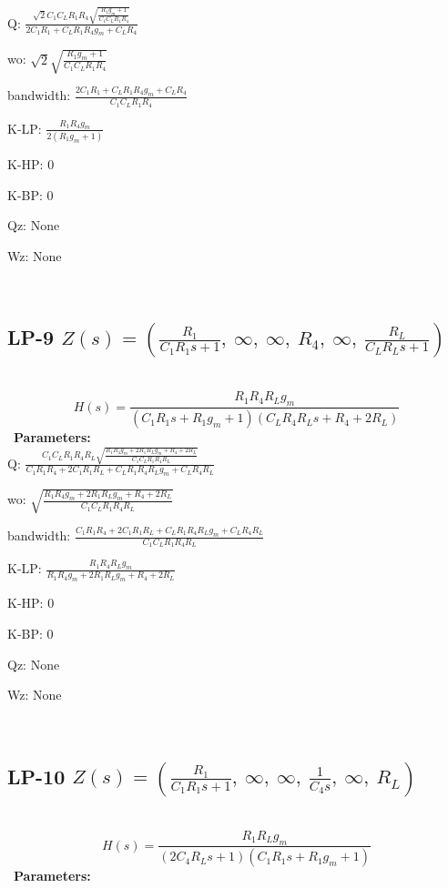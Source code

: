 \documentclass{article}
\begin{document}
Q: $\frac{\sqrt{2} C_{1} C_{L} R_{1} R_{4} \sqrt{\frac{R_{1} g_{m} + 1}{C_{1} C_{L} R_{1} R_{4}}}}{2 C_{1} R_{1} + C_{L} R_{1} R_{4} g_{m} + C_{L} R_{4}}$\ 

wo: $\sqrt{2} \sqrt{\frac{R_{1} g_{m} + 1}{C_{1} C_{L} R_{1} R_{4}}}$\ 

bandwidth: $\frac{2 C_{1} R_{1} + C_{L} R_{1} R_{4} g_{m} + C_{L} R_{4}}{C_{1} C_{L} R_{1} R_{4}}$\ 

K-LP: $\frac{R_{1} R_{4} g_{m}}{2 \left(R_{1} g_{m} + 1\right)}$\ 

K-HP: $0$\ 

K-BP: $0$\ 

Qz: $\text{None}$\ 

Wz: $\text{None}$\ 

\ 

\subsection{LP-9 $Z(s) = \left( \frac{R_{1}}{C_{1} R_{1} s + 1}, \  \infty, \  \infty, \  R_{4}, \  \infty, \  \frac{R_{L}}{C_{L} R_{L} s + 1}\right)$ } \ 
\textbf{\[H(s) = \frac{R_{1} R_{4} R_{L} g_{m}}{\left(C_{1} R_{1} s + R_{1} g_{m} + 1\right) \left(C_{L} R_{4} R_{L} s + R_{4} + 2 R_{L}\right)}\] } \ 
\textbf{Parameters:}\\ 

Q: $\frac{C_{1} C_{L} R_{1} R_{4} R_{L} \sqrt{\frac{R_{1} R_{4} g_{m} + 2 R_{1} R_{L} g_{m} + R_{4} + 2 R_{L}}{C_{1} C_{L} R_{1} R_{4} R_{L}}}}{C_{1} R_{1} R_{4} + 2 C_{1} R_{1} R_{L} + C_{L} R_{1} R_{4} R_{L} g_{m} + C_{L} R_{4} R_{L}}$\ 

wo: $\sqrt{\frac{R_{1} R_{4} g_{m} + 2 R_{1} R_{L} g_{m} + R_{4} + 2 R_{L}}{C_{1} C_{L} R_{1} R_{4} R_{L}}}$\ 

bandwidth: $\frac{C_{1} R_{1} R_{4} + 2 C_{1} R_{1} R_{L} + C_{L} R_{1} R_{4} R_{L} g_{m} + C_{L} R_{4} R_{L}}{C_{1} C_{L} R_{1} R_{4} R_{L}}$\ 

K-LP: $\frac{R_{1} R_{4} R_{L} g_{m}}{R_{1} R_{4} g_{m} + 2 R_{1} R_{L} g_{m} + R_{4} + 2 R_{L}}$\ 

K-HP: $0$\ 

K-BP: $0$\ 

Qz: $\text{None}$\ 

Wz: $\text{None}$\ 

\ 

\subsection{LP-10 $Z(s) = \left( \frac{R_{1}}{C_{1} R_{1} s + 1}, \  \infty, \  \infty, \  \frac{1}{C_{4} s}, \  \infty, \  R_{L}\right)$ } \ 
\textbf{\[H(s) = \frac{R_{1} R_{L} g_{m}}{\left(2 C_{4} R_{L} s + 1\right) \left(C_{1} R_{1} s + R_{1} g_{m} + 1\right)}\] } \ 
\textbf{Parameters:}\\ 
\end{document}
